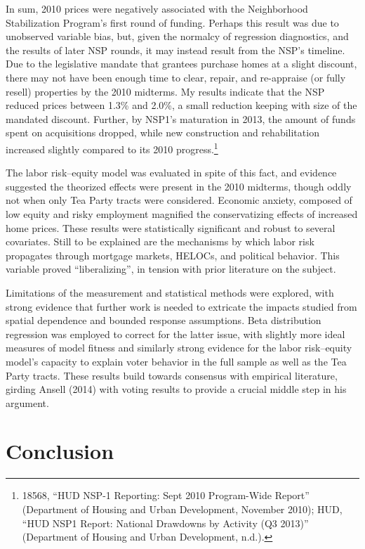 \documentclass[12pt,oneside]{psthesis}
\begin{document}
In sum, 2010 prices were negatively associated with the Neighborhood Stabilization Program's first round of funding.
Perhaps this result was due to unobserved variable bias, but, given the normalcy of regression diagnostics, and the results of later NSP rounds, it may instead result from the NSP's timeline.
Due to the legislative mandate that grantees purchase homes at a slight discount, there may not have been enough time to clear, repair, and re-appraise (or fully resell) properties by the 2010 midterms.
My results indicate that the NSP reduced prices between 1.3\% and 2.0\%, a small reduction keeping with size of the mandated discount.
Further, by NSP1's maturation in 2013, the amount of funds spent on acquisitions dropped, while new construction and rehabilitation increased slightly compared to its 2010 progress.\footnote{18568, ``HUD NSP-1 Reporting: Sept 2010 Program-Wide Report'' (Department of Housing and Urban Development, November 2010); HUD, ``HUD NSP1 Report: National Drawdowns by Activity (Q3 2013)'' (Department of Housing and Urban Development, n.d.).}

The labor risk--equity model was evaluated in spite of this fact, and evidence suggested the theorized effects were present in the 2010 midterms, though oddly not when only Tea Party tracts were considered.
Economic anxiety, composed of low equity and risky employment magnified the conservatizing effects of increased home prices.
These results were statistically significant and robust to several covariates.
Still to be explained are the mechanisms by which labor risk propagates through mortgage markets, HELOCs, and political behavior.
This variable proved ``liberalizing'', in tension with prior literature on the subject.

Limitations of the measurement and statistical methods were explored, with strong evidence that further work is needed to extricate the impacts studied from spatial dependence and bounded response assumptions.
Beta distribution regression was employed to correct for the latter issue, with slightly more ideal measures of model fitness and similarly strong evidence for the labor risk--equity model's capacity to explain voter behavior in the full sample as well as the Tea Party tracts.
These results build towards consensus with empirical literature, girding Ansell (2014) with voting results to provide a crucial middle step in his argument.

\hypertarget{conclusion}{%
\chapter{Conclusion}\label{conclusion}}
\end{document}
